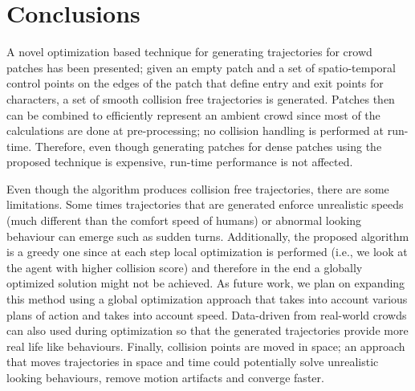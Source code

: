 \section{Conclusions}
\label{sec:conclusions}

A novel optimization based technique for generating trajectories for crowd patches has been presented;
given an empty patch and a set of spatio-temporal control points on the edges of the patch that define entry and exit points for characters, a set of smooth collision free trajectories is generated.
Patches then can be combined to efficiently represent an ambient crowd since most of the calculations are done at pre-processing; no collision handling is performed at run-time.
Therefore, even though generating patches for dense patches using the proposed technique is expensive, run-time performance is not affected.

Even though the algorithm produces collision free trajectories, there are some limitations.
Some times trajectories that are generated enforce unrealistic speeds (much different than the comfort speed of humans) or abnormal looking behaviour can emerge such  as sudden turns.
Additionally, the proposed algorithm is a greedy one since at each step local optimization is performed (i.e., we look at the agent with higher collision score) and therefore in the end a globally optimized solution might not be achieved.
As future work, we plan on expanding this method using a global optimization approach that takes into account various plans of action and takes into account speed.
Data-driven from real-world crowds can also used during optimization so that the generated trajectories provide more real life like behaviours.
Finally, collision points are moved in space; an approach that moves trajectories in space and time could potentially solve unrealistic looking behaviours, remove motion artifacts and converge faster.


